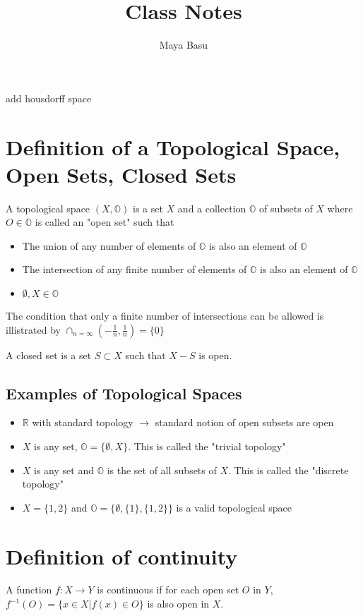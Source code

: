 \documentclass{homework}
\author{Maya Basu}
\title{Class Notes}
\newcommand{\OO}{\mathbb{O}}
\begin{document}
 \maketitle
add housdorff space
\section{Definition of a Topological Space, Open Sets, Closed Sets}

A topological space $(X, \OO)$ is a set $X$ and a collection $\OO$ of subsets of $X$ where $O \in \OO$ is called an "open set" such that
\begin{itemize}
\item{The union of any number of elements of $\OO$ is also an element of $\OO$}
\item{The intersection of any finite number of elements of $\OO$ is also an element of $\OO$}
\item{$\emptyset , X \in \OO$}
\end{itemize}
The condition that only a finite number of intersections can be allowed is illistrated by $\cap_{n = \infty} \left( -\frac{1}{n},\frac{1}{n}\right) = \{0\}$

A closed set is a set $S \subset X$ such that $X-S$ is open.

\subsection{Examples of Topological Spaces}
\begin{itemize}
\item{$\mathbb{R}$ with standard topology $\rightarrow$ standard notion of open subsets are open}
\item{$X$ is any set, $\OO = \{\emptyset,X\}$. This is called the "trivial topology"}
\item{$X$ is any set and $\OO$ is the set of all subsets of $X$. This is called the "discrete topology"}
\item{$X = \{1,2\}$ and $\OO = \{\emptyset, \{1\}, \{1,2\}\}$ is a valid topological space}
\end{itemize}

\section{Definition of continuity}
A function $f: X \rightarrow Y$ is continuous if for each open set $O$ in $Y$, $f^{-1}(O) = \{x \in X | f(x) \in O\}$ is also open in $X$.
\end{document}
